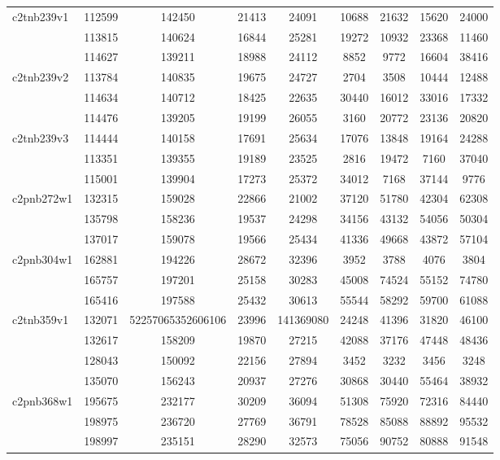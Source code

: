 \documentclass[a4paper]{article}
\begin{document}
\begin{center}
\begin{longtable}{ |l|c|c|c|c|c|c|c|c| }
c2tnb239v1 & 112599 & 142450 & 21413 & 24091 & 10688 & 21632 & 15620 & 24000 \\
& 113815 & 140624 & 16844 & 25281 & 19272 & 10932 & 23368 & 11460 \\
& 114627 & 139211 & 18988 & 24112 & 8852 & 9772 & 16604 & 38416 \\ \hline

c2tnb239v2 & 113784 & 140835 & 19675 & 24727 & 2704 & 3508 & 10444 & 12488 \\
& 114634 & 140712 & 18425 & 22635 & 30440 & 16012 & 33016 & 17332 \\ 
& 114476 & 139205 & 19199 & 26055 & 3160 & 20772 & 23136 & 20820 \\ \hline

c2tnb239v3 & 114444 & 140158 & 17691 & 25634 & 17076 & 13848 & 19164 & 24288 \\
& 113351 & 139355 & 19189 & 23525 & 2816 & 19472 & 7160 & 37040 \\
& 115001 & 139904 & 17273 & 25372 & 34012 & 7168 & 37144 & 9776 \\ \hline

c2pnb272w1 & 132315 & 159028 & 22866 & 21002 & 37120 & 51780 & 42304 & 62308 \\
& 135798 & 158236 & 19537 & 24298 & 34156 & 43132 & 54056 & 50304 \\ 
& 137017 & 159078 & 19566 & 25434 & 41336 & 49668 & 43872 & 57104 \\ \hline

c2pnb304w1 & 162881 & 194226 & 28672 & 32396 & 3952 & 3788 & 4076 & 3804 \\
& 165757 & 197201 & 25158 & 30283 & 45008 & 74524 & 55152 & 74780 \\
& 165416 & 197588 & 25432 & 30613 & 55544 & 58292 & 59700 & 61088 \\ \hline

c2tnb359v1 & 132071 & 52257065352606106 & 23996 & 141369080 & 24248 & 41396 & 31820 & 46100 \\ 
& 132617 & 158209 & 19870 & 27215 & 42088 & 37176 & 47448 & 48436 \\ 
& 128043 & 150092 & 22156 & 27894 & 3452 & 3232 & 3456 & 3248 \\ 
& 135070 & 156243 & 20937 & 27276 & 30868 & 30440 & 55464 & 38932 \\ \hline

c2pnb368w1 & 195675 & 232177 & 30209 & 36094 & 51308 & 75920 & 72316 & 84440 \\
& 198975 & 236720 & 27769 & 36791 & 78528 & 85088 & 88892 & 95532 \\
& 198997 & 235151 & 28290 & 32573 & 75056 & 90752 & 80888 & 91548 \\ \hline


\end{longtable}
\end{center}
\end{document}
